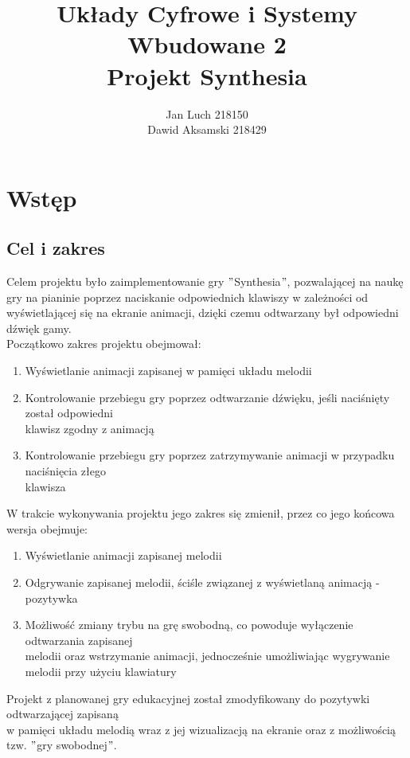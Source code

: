 \documentclass[a4paper]{report}
\title{\huge Układy Cyfrowe i Systemy Wbudowane 2\\Projekt Synthesia}
\date{} %
\author{Jan Luch\hspace{42pt} 218150  \\Dawid Aksamski\hspace{5pt} 218429}
\begin{document}
\frenchspacing
{}
\maketitle
\newpage

\tableofcontents
\newpage


\chapter{Wstęp}
	\section{Cel i zakres}
	Celem projektu było zaimplementowanie gry $"$Synthesia$"$, pozwalającej na naukę gry na pianinie poprzez naciskanie odpowiednich klawiszy w zależności od wyświetlającej się na ekranie animacji, dzięki czemu odtwarzany był odpowiedni dźwięk gamy.\\
	
Początkowo zakres projektu obejmował:
	\begin{enumerate}
	\item Wyświetlanie animacji zapisanej w pamięci układu melodii
	\item Kontrolowanie przebiegu gry poprzez odtwarzanie dźwięku, jeśli naciśnięty został odpowiedni \\klawisz zgodny z animacją
	\item Kontrolowanie przebiegu gry poprzez zatrzymywanie animacji w przypadku naciśnięcia złego \\klawisza
	\end{enumerate}
	
W trakcie wykonywania projektu jego zakres się zmienił, przez co jego końcowa wersja obejmuje:
	\begin{enumerate}
	\item Wyświetlanie animacji zapisanej melodii
	\item Odgrywanie zapisanej  melodii, ściśle związanej z wyświetlaną animacją - pozytywka
	\item Możliwość zmiany trybu na grę swobodną, co powoduje wyłączenie odtwarzania zapisanej \\melodii oraz wstrzymanie animacji, jednocześnie umożliwiając wygrywanie melodii przy użyciu klawiatury
	\end{enumerate}
	
	Projekt z planowanej gry edukacyjnej został zmodyfikowany do pozytywki odtwarzającej zapisaną \\w pamięci układu melodią wraz z jej wizualizacją na ekranie oraz z możliwością tzw. $"$gry swobodnej$"$.
\end{document}

